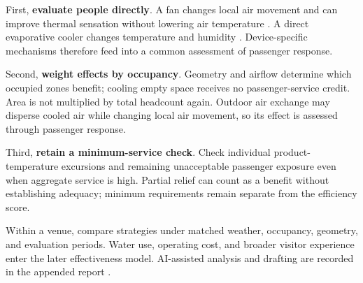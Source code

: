 \documentclass[12pt]{article}
\begin{document}
First, \textbf{evaluate people directly}. A fan changes local air movement and can improve thermal sensation without lowering air temperature \cite{energystar}. A direct evaporative cooler changes temperature and humidity \cite{evap}. Device-specific mechanisms therefore feed into a common assessment of passenger response.

Second, \textbf{weight effects by occupancy}. Geometry and airflow determine which occupied zones benefit; cooling empty space receives no passenger-service credit. Area is not multiplied by total headcount again. Outdoor air exchange may disperse cooled air while changing local air movement, so its effect is assessed through passenger response.

Third, \textbf{retain a minimum-service check}. Check individual product-temperature excursions and remaining unacceptable passenger exposure even when aggregate service is high. Partial relief can count as a benefit without establishing adequacy; minimum requirements remain separate from the efficiency score.

Within a venue, compare strategies under matched weather, occupancy, geometry, and evaluation periods. Water use, operating cost, and broader visitor experience enter the later effectiveness model. AI-assisted analysis and drafting are recorded in the appended report \cite{codex}.
\end{document}
